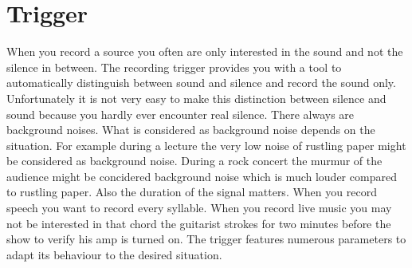 \section{Trigger}
  When you record a source you often are only interested in the sound and not
  the silence in between. The recording trigger provides you with a
  tool to automatically distinguish between sound and silence and record the
  sound only.  Unfortunately it is not very easy to make this distinction between
  silence and sound because you hardly ever encounter real silence. There always
  are background noises. What is considered as background noise depends on the
  situation. For example during a lecture the very low noise of rustling paper
  might be considered as background noise. During a rock concert the murmur of
  the audience might be concidered background noise which is much louder compared
  to rustling paper. Also the duration of the signal matters. When you record
  speech you want to record every syllable. When you record live music you may
  not be interested in that chord the guitarist strokes for two minutes before
  the show to verify his amp is turned on. The trigger features numerous
  parameters to adapt its behaviour to the desired situation.
